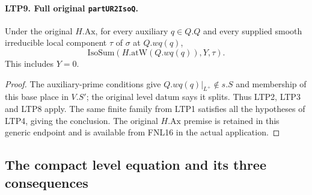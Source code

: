 \documentclass[11pt,a4paper]{article}
\numberwithin{equation}{section}
\theoremstyle{remark}\newtheorem{remark}[theorem]{Remark}
\begin{document}
\paragraph{LTP9. Full original \texttt{part\allowbreak UR2Iso\allowbreak Q}.}
\label{claim:LTP9}
Under the original \(H.\mathrm{Ax}\), for every auxiliary
\(q\in Q.Q\) and every supplied smooth irreducible local component
\(\tau\) of \(\sigma\) at \(Q.wq(q)\),
\[
             \mathrm{IsoSum}(H.\mathrm{atW}(Q.wq(q)),Y,\tau).
\]
This includes \(Y=0\).
\begin{proof}
The auxiliary-prime conditions give
\(Q.wq(q)|_{L^+}\notin s.S\) and membership of this base place
in \(V.S'\); the original level datum says it splits.
Thus LTP2, LTP3 and LTP8 apply.  The same finite family from
LTP1 satisfies all the hypotheses of LTP4, giving the conclusion.
The original \(H.\mathrm{Ax}\) premise is retained in this generic
endpoint and is available from FNL16 in the actual application.
\end{proof}

\subsection{The compact level equation and its three consequences}

\end{document}
